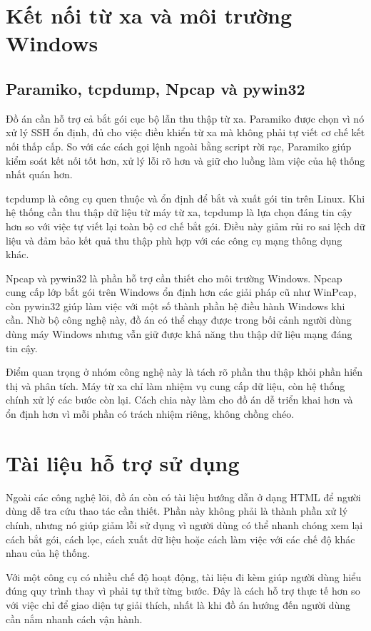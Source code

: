 \documentclass[../DoAn.tex]{subfiles}
\begin{document}
\section{Kết nối từ xa và môi trường Windows}
\subsection{Paramiko, tcpdump, Npcap và pywin32}
Đồ án cần hỗ trợ cả bắt gói cục bộ lẫn thu thập từ xa. Paramiko được chọn vì nó xử lý SSH ổn định, đủ cho việc điều khiển từ xa mà không phải tự viết cơ chế kết nối thấp cấp. So với các cách gọi lệnh ngoài bằng script rời rạc, Paramiko giúp kiểm soát kết nối tốt hơn, xử lý lỗi rõ hơn và giữ cho luồng làm việc của hệ thống nhất quán hơn.

tcpdump là công cụ quen thuộc và ổn định để bắt và xuất gói tin trên Linux. Khi hệ thống cần thu thập dữ liệu từ máy từ xa, tcpdump là lựa chọn đáng tin cậy hơn so với việc tự viết lại toàn bộ cơ chế bắt gói. Điều này giảm rủi ro sai lệch dữ liệu và đảm bảo kết quả thu thập phù hợp với các công cụ mạng thông dụng khác.

Npcap và pywin32 là phần hỗ trợ cần thiết cho môi trường Windows. Npcap cung cấp lớp bắt gói trên Windows ổn định hơn các giải pháp cũ như WinPcap, còn pywin32 giúp làm việc với một số thành phần hệ điều hành Windows khi cần. Nhờ bộ công nghệ này, đồ án có thể chạy được trong bối cảnh người dùng dùng máy Windows nhưng vẫn giữ được khả năng thu thập dữ liệu mạng đáng tin cậy.

Điểm quan trọng ở nhóm công nghệ này là tách rõ phần thu thập khỏi phần hiển thị và phân tích. Máy từ xa chỉ làm nhiệm vụ cung cấp dữ liệu, còn hệ thống chính xử lý các bước còn lại. Cách chia này làm cho đồ án dễ triển khai hơn và ổn định hơn vì mỗi phần có trách nhiệm riêng, không chồng chéo.

\section{Tài liệu hỗ trợ sử dụng}
Ngoài các công nghệ lõi, đồ án còn có tài liệu hướng dẫn ở dạng HTML để người dùng dễ tra cứu thao tác cần thiết. Phần này không phải là thành phần xử lý chính, nhưng nó giúp giảm lỗi sử dụng vì người dùng có thể nhanh chóng xem lại cách bắt gói, cách lọc, cách xuất dữ liệu hoặc cách làm việc với các chế độ khác nhau của hệ thống.

Với một công cụ có nhiều chế độ hoạt động, tài liệu đi kèm giúp người dùng hiểu đúng quy trình thay vì phải tự thử từng bước. Đây là cách hỗ trợ thực tế hơn so với việc chỉ để giao diện tự giải thích, nhất là khi đồ án hướng đến người dùng cần nắm nhanh cách vận hành.
\end{document}
